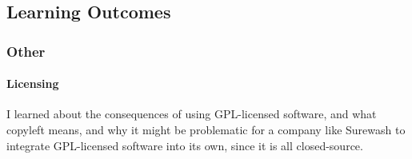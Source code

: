     \subsection{Learning Outcomes}
        \subsubsection{Other}
            \paragraph{Licensing}
            I learned about the consequences of using GPL-licensed software, and what copyleft means, and why it might be problematic for a company like Surewash to integrate GPL-licensed software into its own, since it is all closed-source.
